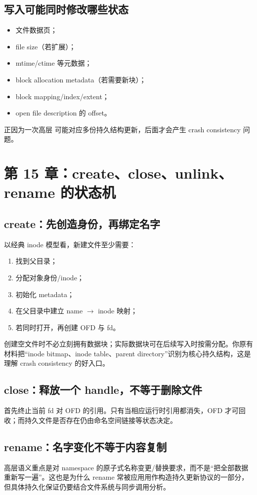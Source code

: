 \documentclass[11pt,a4paper]{ctexart}
\newcommand{\code}[1]{\texttt{\detokenize{#1}}}
\begin{document}
\subsection{写入可能同时修改哪些状态}
\begin{itemize}
  \item 文件数据页；
  \item file size（若扩展）；
  \item mtime/ctime 等元数据；
  \item block allocation metadata（若需要新块）；
  \item block mapping/index/extent；
  \item open file description 的 offset。
\end{itemize}
正因为一次高层 \code{write} 可能对应多份持久结构更新，后面才会产生 crash consistency 问题。

\section{第 15 章：create、close、unlink、rename 的状态机}

\subsection{create：先创造身份，再绑定名字}
以经典 inode 模型看，新建文件至少需要：
\begin{enumerate}
  \item 找到父目录；
  \item 分配对象身份/inode；
  \item 初始化 metadata；
  \item 在父目录中建立 name $\to$ inode 映射；
  \item 若同时打开，再创建 OFD 与 fd。
\end{enumerate}
创建空文件时不必立刻拥有数据块；实际数据块可在后续写入时按需分配。你原有材料把“inode bitmap、inode table、parent directory”识别为核心持久结构，这是理解 crash consistency 的好入口。

\subsection{close：释放一个 handle，不等于删除文件}
\code{close(fd)} 首先终止当前 fd 对 OFD 的引用。只有当相应运行时引用都消失，OFD 才可回收；而持久文件是否存在仍由命名空间链接等状态决定。

\subsection{rename：名字变化不等于内容复制}
高层语义重点是对 namespace 的原子式名称变更/替换要求，而不是“把全部数据重新写一遍”。这也是为什么 rename 常被应用用作构造持久更新协议的一部分，但具体持久化保证仍要结合文件系统与同步调用分析。
\end{document}
